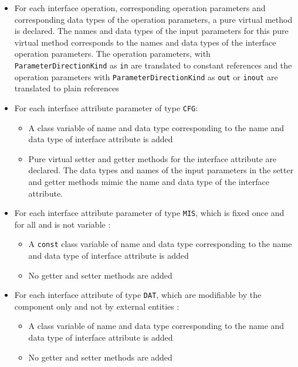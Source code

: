\begin{itemize}
\item For each interface operation, corresponding operation parameters and corresponding data types of the operation parameters, a pure virtual method is declared. The names and data types of the input parameters for this pure virtual method corresponds to the names and data types of the interface operation parameters. The operation parameters, with \texttt{ParameterDirectionKind} as \texttt{in} are translated to constant references and the operation parameters with \texttt{ParameterDirectionKind} as \texttt{out} or \texttt{inout} are translated to plain references 
\item For each interface attribute parameter of type \texttt{CFG}:
\begin{itemize}
\item A class variable of name and data type corresponding to the name and data type of interface attribute is added
\item Pure virtual setter and getter methods for the interface attribute are declared. The data types and names of the input parameters in the setter and getter methods mimic the name and data type of the interface attribute.
\end{itemize} 
\item For each interface attribute parameter of type \texttt{MIS}, which is fixed once and for all and is not variable \cite{SpecMetamodel}: 
\begin{itemize}
\item A \texttt{const} class variable of name and data type corresponding to the name and data type of interface attribute is added
\item No getter and setter methods are added
\end{itemize}
\item For each interface attribute of type \texttt{DAT}, which are modifiable by the component only and not by external entities \cite{SpecMetamodel}:
\begin{itemize}
\item A class variable of name and data type corresponding to the name and data type of interface attribute is added
\item No getter and setter methods are added  
\end{itemize}   
\end{itemize}

